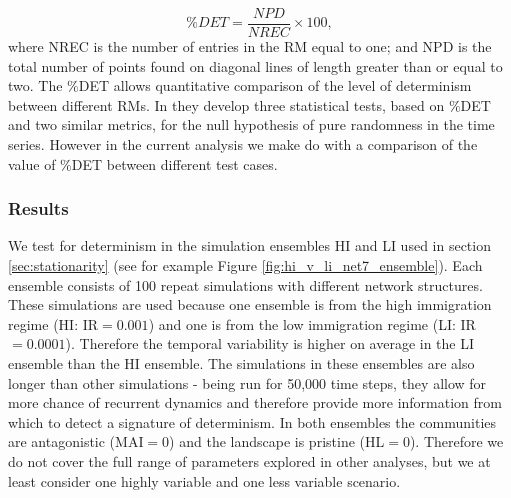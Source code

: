 \begin{equation}
\%DET = \frac{NPD}{NREC} \times 100,
\label{eq:pd}
\end{equation}
%
where NREC is the number of entries in the RM equal to one; and NPD is the total number of points found on diagonal lines of length greater than or equal to two. The $\%$DET allows quantitative comparison of the level of determinism between different RMs. In \cite{aparicio2008detecting} they develop three statistical tests, based on $\%$DET and two similar metrics, for the null hypothesis of pure randomness in the time series. However in the current analysis we make do with a comparison of the value of $\%$DET between different test cases.  




\subsubsection{Results}
\label{sec:rqa_results}

We test for determinism in the simulation ensembles HI and LI used in section \ref{sec:stationarity} (see for example Figure \ref{fig:hi_v_li_net7_ensemble}).  Each ensemble consists of 100 repeat simulations with different network structures. These simulations are used because one ensemble is from the high immigration regime (HI: IR$=0.001$) and one is from the low immigration regime (LI: IR$=0.0001$). Therefore the temporal variability is higher on average in the LI ensemble than the HI ensemble. The simulations in these ensembles are also longer than other simulations - being run for 50,000 time steps, they allow for more chance of recurrent dynamics and therefore provide more information from which to detect a signature of determinism. In both ensembles the communities are antagonistic (MAI$=0$) and the landscape is pristine (HL$=0$). Therefore we do not cover the full range of parameters explored in other analyses, but we at least consider one highly variable and one less variable scenario.

